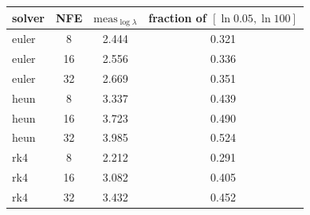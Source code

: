 \begin{tabular}{lccc}
\toprule
solver & NFE & $\mathrm{meas}_{\log\lambda}$ & fraction of $[\ln 0.05,\ln 100]$ \\
\midrule
euler & 8 & 2.444 & 0.321 \\
euler & 16 & 2.556 & 0.336 \\
euler & 32 & 2.669 & 0.351 \\
heun & 8 & 3.337 & 0.439 \\
heun & 16 & 3.723 & 0.490 \\
heun & 32 & 3.985 & 0.524 \\
rk4 & 8 & 2.212 & 0.291 \\
rk4 & 16 & 3.082 & 0.405 \\
rk4 & 32 & 3.432 & 0.452 \\
\bottomrule
\end{tabular}
